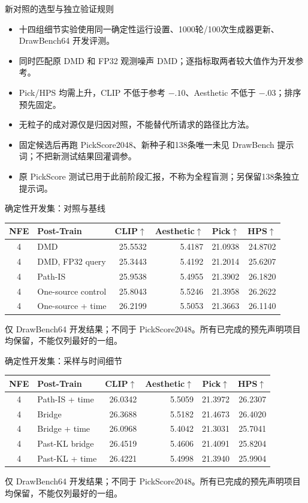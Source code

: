 \documentclass[10pt,aspectratio=169]{beamer}
\begin{document}
\begin{frame}{新对照的选型与独立验证规则}
\small
\begin{itemize}\itemsep5pt
\item 十四组细节实验使用同一确定性运行设置、1000轮/100次生成器更新、DrawBench64 开发评测。
\item 同时匹配原 DMD 和 FP32 观测噪声 DMD；逐指标取两者较大值作为开发参考。
\item Pick/HPS 均需上升，CLIP 不低于参考 $-.10$、Aesthetic 不低于 $-.03$；排序预先固定。
\item 无粒子的成对源仅是归因对照，不能替代所请求的路径比方法。
\item 固定候选后再跑 PickScore2048、新种子和138条唯一未见 DrawBench 提示词；不把新测试结果回灌调参。
\item 原 PickScore 测试已用于此前阶段汇报，不称为全程盲测；另保留138条独立提示词。
\end{itemize}
\end{frame}
\begin{frame}{确定性开发集：对照与基线}
\scriptsize\centering
\begin{tabular}{clrrrr}\toprule
NFE & Post-Train & CLIP$\uparrow$ & Aesthetic$\uparrow$ & Pick$\uparrow$ & HPS$\uparrow$\\\midrule
4 & DMD & 25.5532 & 5.4187 & 21.0938 & 24.8702 \\
4 & DMD, FP32 query & 25.3443 & 5.4192 & 21.2014 & 25.6207 \\
4 & Path-IS & 25.9538 & 5.4955 & 21.3902 & 26.1820 \\
4 & One-source control & 25.8043 & 5.5246 & 21.3958 & 26.2622 \\
4 & One-source + time & 26.2199 & 5.5053 & 21.3663 & 26.1140 \\
\bottomrule\end{tabular}\par\raggedright\vspace{6pt}
仅 DrawBench64 开发结果；不同于 PickScore2048。所有已完成的预先声明项目均保留，不能仅列最好的一组。
\end{frame}
\begin{frame}{确定性开发集：采样与时间细节}
\scriptsize\centering
\begin{tabular}{clrrrr}\toprule
NFE & Post-Train & CLIP$\uparrow$ & Aesthetic$\uparrow$ & Pick$\uparrow$ & HPS$\uparrow$\\\midrule
4 & Path-IS + time & 26.0342 & 5.5059 & 21.3972 & 26.2307 \\
4 & Bridge & 26.3688 & 5.5182 & 21.4673 & 26.4020 \\
4 & Bridge + time & 26.0968 & 5.4042 & 21.3031 & 25.7041 \\
4 & Past-KL bridge & 26.4519 & 5.4606 & 21.4091 & 25.8204 \\
4 & Past-KL + time & 26.4221 & 5.4998 & 21.3940 & 25.9904 \\
\bottomrule\end{tabular}\par\raggedright\vspace{6pt}
仅 DrawBench64 开发结果；不同于 PickScore2048。所有已完成的预先声明项目均保留，不能仅列最好的一组。
\end{frame}
\end{document}

